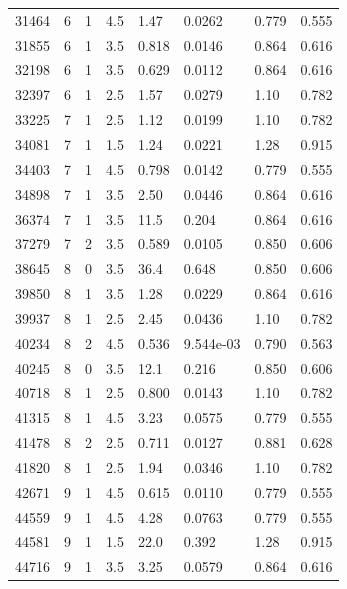 \documentclass[preview]{standalone}
\begin{document}
{{{\begin{tabular}{L{1.2cm}C{1.2cm} C{0.3cm}C{0.5cm} C{1.4cm}C{1.4cm} C{1.4cm}C{1.4cm}}
  31464  &     6  & 1     & 4.5 &  1.47  & 0.0262  & 0.779 &  0.555   \\ 
  31855  &     6  & 1     & 3.5 &  0.818  & 0.0146  & 0.864 &  0.616   \\ 
  32198  &     6  & 1     & 3.5 &  0.629  & 0.0112  & 0.864 &  0.616   \\ 
  32397  &     6  & 1     & 2.5 &  1.57  & 0.0279  & 1.10 &  0.782   \\ 
  33225  &     7  & 1     & 2.5 &  1.12  & 0.0199  & 1.10 &  0.782   \\ 
  34081  &     7  & 1     & 1.5 &  1.24  & 0.0221  & 1.28 &  0.915   \\ 
  34403  &     7  & 1     & 4.5 &  0.798  & 0.0142  & 0.779 &  0.555   \\ 
  34898  &     7  & 1     & 3.5 &  2.50  & 0.0446  & 0.864 &  0.616   \\ 
  36374  &     7  & 1     & 3.5 &  11.5  & 0.204  & 0.864 &  0.616   \\ 
  37279  &     7  & 2     & 3.5 &  0.589  & 0.0105  & 0.850 &  0.606   \\ 
  38645  &     8  & 0     & 3.5 &  36.4  & 0.648  & 0.850 &  0.606   \\ 
  39850  &     8  & 1     & 3.5 &  1.28  & 0.0229  & 0.864 &  0.616   \\ 
  39937  &     8  & 1     & 2.5 &  2.45  & 0.0436  & 1.10 &  0.782   \\ 
  40234  &     8  & 2     & 4.5 &  0.536  & 9.544e-03  & 0.790 &  0.563   \\ 
  40245  &     8  & 0     & 3.5 &  12.1  & 0.216  & 0.850 &  0.606   \\ 
  40718  &     8  & 1     & 2.5 &  0.800  & 0.0143  & 1.10 &  0.782   \\ 
  41315  &     8  & 1     & 4.5 &  3.23  & 0.0575  & 0.779 &  0.555   \\ 
  41478  &     8  & 2     & 2.5 &  0.711  & 0.0127  & 0.881 &  0.628   \\ 
  41820  &     8  & 1     & 2.5 &  1.94  & 0.0346  & 1.10 &  0.782   \\ 
  42671  &     9  & 1     & 4.5 &  0.615  & 0.0110  & 0.779 &  0.555   \\ 
  44559  &     9  & 1     & 4.5 &  4.28  & 0.0763  & 0.779 &  0.555   \\ 
  44581  &     9  & 1     & 1.5 &  22.0  & 0.392  & 1.28 &  0.915   \\ 
  44716  &     9  & 1     & 3.5 &  3.25  & 0.0579  & 0.864 &  0.616   \\ 

\end{tabular}}}}
\end{document}
